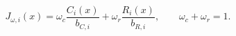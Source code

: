 \documentclass{article}
\begin{document}
\[
J_{\omega,i}(x)=\omega_c\frac{C_i(x)}{b_{C,i}}+\omega_r\frac{R_i(x)}{b_{R,i}},\qquad\omega_c+\omega_r=1.
\]
\end{document}

